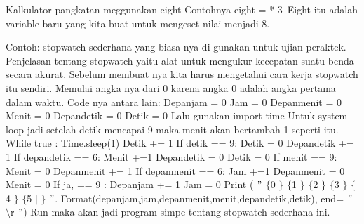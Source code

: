Kalkulator pangkatan meggunakan eight 
Contohnya eight = \2** 3\ 
Eight itu adalah variable baru yang kita buat untuk mengeset nilai menjadi 8.

Contoh: stopwatch sederhana yang biasa nya di gunakan untuk ujian peraktek.  
Penjelasan tentang stopwatch yaitu alat untuk mengukur kecepatan suatu benda secara akurat. 
Sebelum membuat nya kita harus mengetahui cara kerja stopwatch itu sendiri. Memulai angka nya dari 0 karena angka 0 adalah angka pertama dalam waktu.
Code nya antara lain:
	Depanjam = 0 
	Jam = 0 
	Depanmenit = 0 
	Menit = 0 
	Depandetik = 0 
	Detik = 0 
Lalu gunakan import time 
Untuk system loop jadi setelah detik mencapai 9 maka menit akan bertambah 1 seperti itu. 
	While true : 
	Time.sleep(1) 
	Detik += 1 
	If detik == 9: 
	Detik = 0 
	Depandetik += 1 
	If depandetik == 6:
	Menit +=1 
	Depandetik = 0 
	Detik = 0 
	If menit == 9: 
	Menit = 0 
	Depanmenit += 1 
	If depanmenit == 6: 
	Jam +=1 
	Depanmenit = 0 
	Menit = 0 
	If ja, == 9 : 
	Depanjam += 1 
	Jam = 0 
Print ( $ " $ $  \{  $0 $  \}  $ $  \{  $1 $  \}  $ $  \{  $2 $  \}  $ $  \{  $3 $  \}  $ $  \{  $4 $  \}  $ $  \{  $5 $  \vert  $ $  \}  $ $ " $. Format(depanjam,jam,depanmenit,menit,depandetik,detik), end= $ " $ $  \setminus  $r $ " $) 
Run maka akan jadi program simpe tentang stopwatch sederhana ini.
